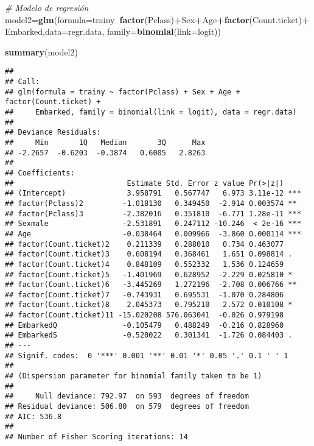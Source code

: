 \documentclass[
]{article}
\newenvironment{Shaded}{\begin{snugshade}}{\end{snugshade}}
\newcommand{\CommentTok}[1]{\textcolor[rgb]{0.56,0.35,0.01}{\textit{#1}}}
\newcommand{\DataTypeTok}[1]{\textcolor[rgb]{0.13,0.29,0.53}{#1}}
\newcommand{\KeywordTok}[1]{\textcolor[rgb]{0.13,0.29,0.53}{\textbf{#1}}}
\newcommand{\NormalTok}[1]{#1}
\newcommand{\OperatorTok}[1]{\textcolor[rgb]{0.81,0.36,0.00}{\textbf{#1}}}
\begin{document}
\texttt{}

\begin{Shaded}
\begin{Highlighting}[]
\CommentTok{# Modelo de regresión}
\NormalTok{model2=}\KeywordTok{glm}\NormalTok{(}\DataTypeTok{formula=}\NormalTok{trainy}\OperatorTok{~}\KeywordTok{factor}\NormalTok{(Pclass)}\OperatorTok{+}\NormalTok{Sex}\OperatorTok{+}\NormalTok{Age}\OperatorTok{+}\KeywordTok{factor}\NormalTok{(Count.ticket)}\OperatorTok{+}\NormalTok{Embarked,}\DataTypeTok{data=}\NormalTok{regr.data, }\DataTypeTok{family=}\KeywordTok{binomial}\NormalTok{(}\DataTypeTok{link=}\NormalTok{logit))}

\KeywordTok{summary}\NormalTok{(model2)}
\end{Highlighting}
\end{Shaded}

\begin{verbatim}
## 
## Call:
## glm(formula = trainy ~ factor(Pclass) + Sex + Age + factor(Count.ticket) + 
##     Embarked, family = binomial(link = logit), data = regr.data)
## 
## Deviance Residuals: 
##     Min       1Q   Median       3Q      Max  
## -2.2657  -0.6203  -0.3874   0.6005   2.8263  
## 
## Coefficients:
##                          Estimate Std. Error z value Pr(>|z|)    
## (Intercept)              3.958791   0.567747   6.973 3.11e-12 ***
## factor(Pclass)2         -1.018130   0.349450  -2.914 0.003574 ** 
## factor(Pclass)3         -2.382016   0.351810  -6.771 1.28e-11 ***
## Sexmale                 -2.531891   0.247112 -10.246  < 2e-16 ***
## Age                     -0.038464   0.009966  -3.860 0.000114 ***
## factor(Count.ticket)2    0.211339   0.288010   0.734 0.463077    
## factor(Count.ticket)3    0.608194   0.368461   1.651 0.098814 .  
## factor(Count.ticket)4    0.848109   0.552332   1.536 0.124659    
## factor(Count.ticket)5   -1.401969   0.628952  -2.229 0.025810 *  
## factor(Count.ticket)6   -3.445269   1.272196  -2.708 0.006766 ** 
## factor(Count.ticket)7   -0.743931   0.695531  -1.070 0.284806    
## factor(Count.ticket)8    2.045373   0.795210   2.572 0.010108 *  
## factor(Count.ticket)11 -15.020208 576.063041  -0.026 0.979198    
## EmbarkedQ               -0.105479   0.488249  -0.216 0.828960    
## EmbarkedS               -0.520022   0.301341  -1.726 0.084403 .  
## ---
## Signif. codes:  0 '***' 0.001 '**' 0.01 '*' 0.05 '.' 0.1 ' ' 1
## 
## (Dispersion parameter for binomial family taken to be 1)
## 
##     Null deviance: 792.97  on 593  degrees of freedom
## Residual deviance: 506.80  on 579  degrees of freedom
## AIC: 536.8
## 
## Number of Fisher Scoring iterations: 14
\end{verbatim}
\end{document}
